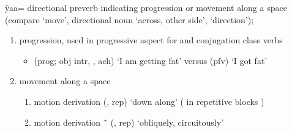 \begin{morphdesc}[resume*=alphalist]
\item[ÿaa=]\label{m:ÿaa=along}
	directional preverb indicating progression or movement along a space
	(compare  ‘move’,
		directional noun  ‘across, other side’,
		 ‘direction’);
	\begin{enumerate}
	\item	progression, used in progressive aspect for  and  conjugation class verbs
		\begin{itemize}
		\item	{} (prog; obj intr, , ach) ‘I am getting fat’\newline
			versus  (pfv) ‘I got fat’
		\end{itemize}
	\item	movement along a space
		\begin{enumerate}
		\item	motion derivation
				 (,  rep) ‘down along’
				( in repetitive blocks )
		\item	motion derivation
				 \~\  (,  rep) ‘obliquely, circuitously’
		\end{enumerate}
	\end{enumerate}


\end{morphdesc}
